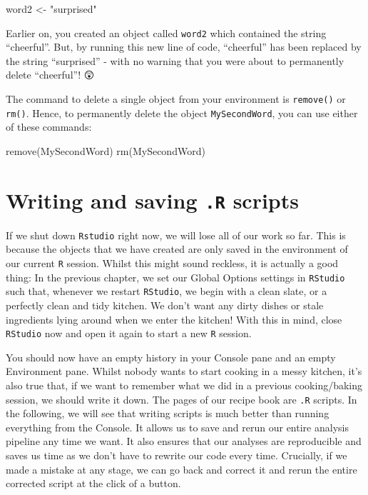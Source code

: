 \documentclass[
  letterpaper,
  DIV=11,
  numbers=noendperiod]{scrreprt}
\newenvironment{Shaded}{\begin{snugshade}}{\end{snugshade}}
\newcommand{\FunctionTok}[1]{\textcolor[rgb]{0.28,0.35,0.67}{#1}}
\newcommand{\NormalTok}[1]{\textcolor[rgb]{0.00,0.23,0.31}{#1}}
\newcommand{\OtherTok}[1]{\textcolor[rgb]{0.00,0.23,0.31}{#1}}
\newcommand{\StringTok}[1]{\textcolor[rgb]{0.13,0.47,0.30}{#1}}
\begin{document}
\begin{Shaded}
\begin{Highlighting}[]
\NormalTok{word2 }\OtherTok{\textless{}{-}} \StringTok{"surprised"}
\end{Highlighting}
\end{Shaded}

Earlier on, you created an object called \texttt{word2} which contained
the string ``cheerful''. But, by running this new line of code,
``cheerful'' has been replaced by the string ``surprised'' - with no
warning that you were about to permanently delete ``cheerful''! 😲

The command to delete a single object from your environment is
\texttt{remove()} or \texttt{rm()}. Hence, to permanently delete the
object \texttt{MySecondWord}, you can use either of these commands:

\begin{Shaded}
\begin{Highlighting}[]
\FunctionTok{remove}\NormalTok{(MySecondWord)}
\FunctionTok{rm}\NormalTok{(MySecondWord)}
\end{Highlighting}
\end{Shaded}

\section{\texorpdfstring{Writing and saving \texttt{.R}
scripts}{Writing and saving .R scripts}}\label{writing-and-saving-.r-scripts}

If we shut down \texttt{Rstudio} right now, we will lose all of our work
so far. This is because the objects that we have created are only saved
in the environment of our current \texttt{R} session. Whilst this might
sound reckless, it is actually a good thing: In the previous chapter, we
set our Global Options settings in \texttt{RStudio} such that, whenever
we restart \texttt{RStudio}, we begin with a clean slate, or a perfectly
clean and tidy kitchen. We don't want any dirty dishes or stale
ingredients lying around when we enter the kitchen! With this in mind,
close \texttt{RStudio} now and open it again to start a new \texttt{R}
session.

You should now have an empty history in your Console pane and an empty
Environment pane. Whilst nobody wants to start cooking in a messy
kitchen, it's also true that, if we want to remember what we did in a
previous cooking/baking session, we should write it down. The pages of
our recipe book are \texttt{.R} scripts. In the following, we will see
that writing scripts is much better than running everything from the
Console. It allows us to save and rerun our entire analysis pipeline any
time we want. It also ensures that our analyses are reproducible and
saves us time as we don't have to rewrite our code every time.
Crucially, if we made a mistake at any stage, we can go back and correct
it and rerun the entire corrected script at the click of a button.
\end{document}
